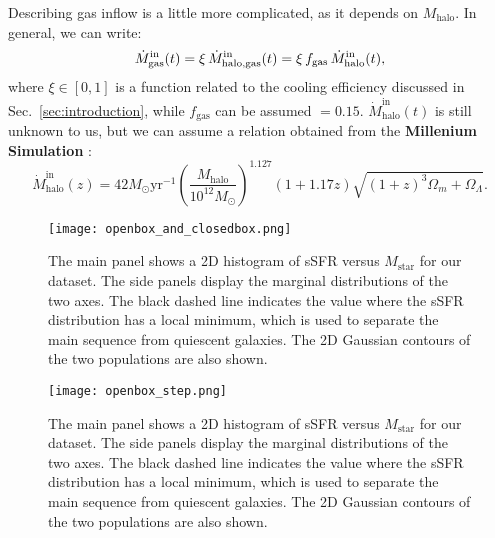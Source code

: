 \documentclass[fleqn,usenatbib]{mnras}
\begin{document}
Describing gas inflow is a little more complicated, as it depends on $M_\text{halo}$. In general, we can write:
\begin{equation}
    \dot{M}_\text{gas}^\text{in}(t) = \xi \, \dot{M}_\text{halo,\rm gas}^\text{in}(t) = \xi \, f_\text{gas} \, \dot{M}_\text{halo}^\text{in}(t),
	\label{eq:mdotin}
\end{equation}
where $\xi \in [0,1]$ is a function related to the cooling efficiency discussed in Sec.~\ref{sec:introduction}, while $f_\text{gas}$ can be assumed $=0.15$. $\dot{M}_\text{halo}^\text{in}(t)$ is still unknown to us, but we can assume a relation obtained from the \textbf{Millenium Simulation} \citep{McBride_2009}:
{\fontsize{7.9pt}{7.9pt}\begin{equation}
    \dot{M}_\text{halo}^\text{in}(z) = 42 M_{\odot} \text{yr}^{-1} \left(\dfrac{M_\text{halo}}{10^{12}M_{\odot}}\right)^{1.127} (1+1.17z) \sqrt{(1+z)^3 \Omega_m + \Omega_\Lambda}.
	\label{eq:mcbride}
\end{equation}}



\newpage
\begin{figure}
    \begin{centering}
	\texttt{[image: openbox\_and\_closedbox.png]}
    \caption{The main panel shows a 2D histogram of sSFR versus $M_{\text{star}}$ for our dataset. The side panels display the marginal distributions of the two axes. The black dashed line indicates the value where the sSFR distribution has a local minimum, which is used to separate the main sequence from quiescent galaxies. The 2D Gaussian contours of the two populations are also shown.}
    \end{centering}
    \label{fig:openbox_and_closedbox}
\end{figure}

\begin{figure}
    \begin{centering}
	\texttt{[image: openbox\_step.png]}
    \caption{The main panel shows a 2D histogram of sSFR versus $M_{\text{star}}$ for our dataset. The side panels display the marginal distributions of the two axes. The black dashed line indicates the value where the sSFR distribution has a local minimum, which is used to separate the main sequence from quiescent galaxies. The 2D Gaussian contours of the two populations are also shown.}
    \end{centering}
    \label{fig:openbox_step}
\end{figure}
\end{document}
